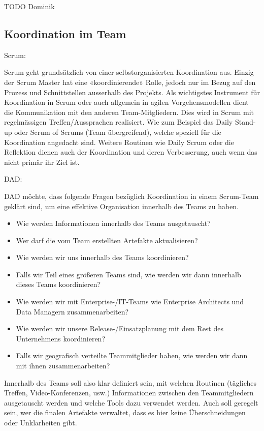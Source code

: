 TODO Dominik



\subsection{Koordination im Team}



{\Large Scrum:} \cite{planningReleaseScrum} \medskip

Scrum geht grundsätzlich von einer selbstorganisierten Koordination aus. Einzig der Scrum Master hat eine «koordinierende» Rolle, jedoch nur im Bezug auf den Prozess und Schnittstellen ausserhalb des Projekts.
Als wichtigstes Instrument für Koordination in Scrum oder auch allgemein in agilen Vorgehensmodellen dient die Kommunikation mit den anderen Team-Mitgliedern. Dies wird in Scrum mit regelmässigen Treffen/Aussprachen realisiert. Wie zum Beispiel das Daily Stand-up oder Scrum of Scrums (Team übergreifend), welche speziell für die Koordination angedacht sind. Weitere Routinen wie Daily Scrum oder die Reflektion dienen auch der Koordination und deren Verbesserung, auch wenn das nicht primär ihr Ziel ist.
\bigskip 

{\Large DAD:} \cite{planningReleaseDad} \medskip

DAD möchte, dass folgende Fragen bezüglich Koordination in einem Scrum-Team geklärt sind, um eine effektive Organisation innerhalb des Teams zu haben.
\begin{itemize}
	\item 	Wie werden Informationen innerhalb des Teams ausgetauscht?
	\item 	Wer darf die vom Team erstellten Artefakte aktualisieren? 
	\item 	Wie werden wir uns innerhalb des Teams koordinieren?
	\item 	Falls wir Teil eines größeren Teams sind, wie werden wir dann innerhalb dieses Teams koordinieren?
	\item 	Wie werden wir mit Enterprise-/IT-Teams wie Enterprise Architects und Data Managern zusammenarbeiten?
	\item 	Wie werden wir unsere Release-/Einsatzplanung mit dem Rest des Unternehmens koordinieren?
	\item 	Falls wir geografisch verteilte Teammitglieder haben, wie werden wir dann mit ihnen zusammenarbeiten?
\end{itemize}
Innerhalb des Teams soll also klar definiert sein, mit welchen Routinen (tägliches Treffen, Video-Konferenzen, usw.) Informationen zwischen den Teammitgliedern ausgetauscht werden und welche Tools dazu verwendet werden. Auch soll geregelt sein, wer die finalen Artefakte verwaltet, dass es hier keine Überschneidungen oder Unklarheiten gibt.
\medskip

